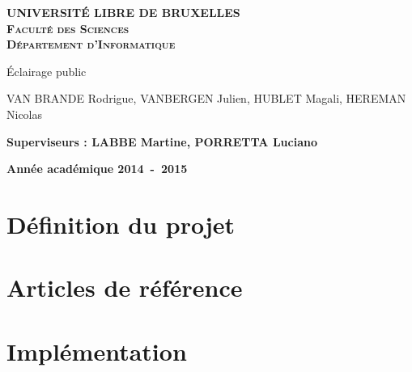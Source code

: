\documentclass[a4paper,10pt]{report}
\begin{document}
\begin{titlepage}
\begin{center}
\textbf{\textsc{UNIVERSIT\'E LIBRE DE BRUXELLES}}\\
\textbf{\textsc{Facult\'e des Sciences}}\\
\textbf{\textsc{D\'epartement d'Informatique}}
\vfill{}\vfill{}
\begin{center}{\Huge \'Eclairage public}\end{center}{\Huge \par}
\begin{center}{\large VAN BRANDE Rodrigue, VANBERGEN Julien, HUBLET Magali, HEREMAN Nicolas}\end{center}{\Huge \par}
\vfill{}\vfill{}
\begin{flushleft}{\large \textbf{Superviseurs : LABBE Martine, PORRETTA Luciano}}\hfill{}\end{flushleft}{\large\par}
\vfill{}\vfill{}\enlargethispage{3cm}
\textbf{Ann\'ee acad\'emique 2014~-~2015}
\end{center}
\end{titlepage}



\tableofcontents


\chapter{D\'efinition du projet}


\chapter{Articles de r\'ef\'erence}


\chapter{Impl\'ementation}




\end{document}
